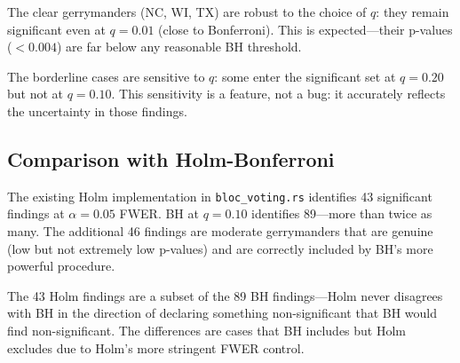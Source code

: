 The clear gerrymanders (NC, WI, TX) are robust to the choice of $q$:
they remain significant even at $q = 0.01$ (close to Bonferroni).
This is expected---their p-values ($< 0.004$) are far below any reasonable
BH threshold.

The borderline cases are sensitive to $q$: some enter the significant
set at $q = 0.20$ but not at $q = 0.10$.
This sensitivity is a feature, not a bug: it accurately reflects the
uncertainty in those findings.

\subsection{Comparison with Holm-Bonferroni}

The existing Holm implementation in \texttt{bloc\_voting.rs} identifies
43 significant findings at $\alpha = 0.05$ FWER.
BH at $q = 0.10$ identifies 89---more than twice as many.
The additional 46 findings are moderate gerrymanders that are genuine
(low but not extremely low p-values) and are correctly included by
BH's more powerful procedure.

The 43 Holm findings are a subset of the 89 BH findings---Holm never
disagrees with BH in the direction of declaring something non-significant
that BH would find non-significant.
The differences are cases that BH includes but Holm excludes due to
Holm's more stringent FWER control.
